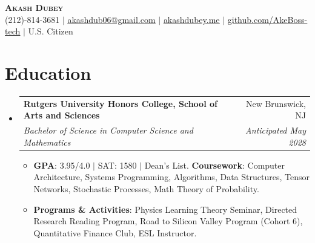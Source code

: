 \documentclass[letterpaper,11pt]{article}
\makeatletter
\newcommand{\resumeItem}[1]{
  \item\small{
    {#1 \vspace{-2pt}}
  }
}
\newcommand{\resumeSubheading}[4]{
  \vspace{-2pt}\item
    \begin{tabular*}{0.97\textwidth}[t]{l@{\extracolsep{\fill}}r}
      \textbf{#1} & #2 \\
      \textit{\small#3} & \textit{\small #4} \\
    \end{tabular*}\vspace{-7pt}
}
\newcommand{\resumeSubHeadingListStart}{\begin{itemize}[leftmargin=0.15in, label={}]}
\newcommand{\resumeSubHeadingListEnd}{\end{itemize}}
\newcommand{\resumeItemListStart}{\begin{itemize}}
\newcommand{\resumeItemListEnd}{\end{itemize}\vspace{-5pt}}
\makeatother
\begin{document}
\begin{center}
    \textbf{\Huge \scshape Akash Dubey} \\ \vspace{1pt}
    \small (212)-814-3681 $|$ \href{mailto:akashdub06@gmail.com}{\underline{akashdub06@gmail.com}} $|$
    \href{https://akashdubey.me/}{\underline{akashdubey.me}} $|$
    \href{https://github.com/AkeBoss-tech}{\underline{github.com/AkeBoss-tech}} $|$
    \small U.S. Citizen
\end{center}
\section{Education}
  \resumeSubHeadingListStart
    \resumeSubheading
      {Rutgers University Honors College, School of Arts and Sciences}{New Brunswick, NJ}
      {Bachelor of Science in Computer Science and Mathematics}{Anticipated May 2028}
      \resumeItemListStart
        \resumeItem{\textbf{GPA}: 3.95/4.0 $|$ SAT: 1580 $|$ Dean's List. \textbf{Coursework}: Computer Architecture, Systems Programming, Algorithms, Data Structures, Tensor Networks, Stochastic Processes, Math Theory of Probability.}
        \resumeItem{\textbf{Programs \& Activities}: Physics Learning Theory Seminar, Directed Research Reading Program, Road to Silicon Valley Program (Cohort 6), Quantitative Finance Club, ESL Instructor.}
      \resumeItemListEnd
  \resumeSubHeadingListEnd
\end{document}
